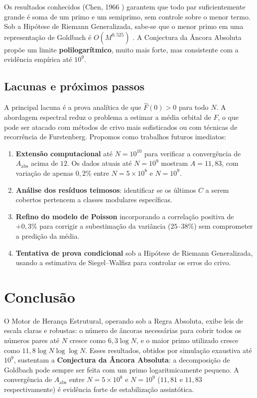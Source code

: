 \documentclass[11pt]{article}
\begin{document}
	Os resultados conhecidos (Chen, 1966 \cite{chen}) garantem que todo par suficientemente grande é soma de um primo e um semiprimo, sem controle sobre o menor termo. Sob a Hipótese de Riemann Generalizada, sabe-se que o menor primo em uma representação de Goldbach é $O(M^{0,525})$ \cite{BHP}. A Conjectura da Âncora Absoluta propõe um limite \textbf{polilogarítmico}, muito mais forte, mas consistente com a evidência empírica até $10^9$.
	
	\subsection{Lacunas e próximos passos}
	
	A principal lacuna é a prova analítica de que $\widehat{F}(0) > 0$ para todo $N$. A abordagem espectral reduz o problema a estimar a média orbital de $F$, o que pode ser atacado com métodos de crivo mais sofisticados ou com técnicas de recorrência de Furstenberg. Propomos como trabalhos futuros imediatos:
	
	\begin{enumerate}
		\item \textbf{Extensão computacional} até $N=10^{10}$ para verificar a convergência de $A_{\text{abs}}$ acima de $12$. Os dados atuais até $N=10^9$ mostram $A=11{,}83$, com variação de apenas $0{,}2\%$ entre $N=5\times10^8$ e $N=10^9$.
		\item \textbf{Análise dos resíduos teimosos}: identificar se os últimos $C$ a serem cobertos pertencem a classes modulares específicas.
		\item \textbf{Refino do modelo de Poisson} incorporando a correlação positiva de $+0{,}3\%$ para corrigir a subestimação da variância ($25$–$38\%$) sem comprometer a predição da média.
		\item \textbf{Tentativa de prova condicional} sob a Hipótese de Riemann Generalizada, usando a estimativa de Siegel–Walfisz para controlar os erros do crivo.
	\end{enumerate}
	
	\section{Conclusão}
	
	O Motor de Herança Estrutural, operando sob a Regra Absoluta, exibe leis de escala claras e robustas: o número de âncoras necessárias para cobrir todos os números pares até $N$ cresce como $6{,}3\log N$, e o maior primo utilizado cresce como $11{,}8 \log N \log\log N$. Esses resultados, obtidos por simulação exaustiva até $10^9$, sustentam a \textbf{Conjectura da Âncora Absoluta}: a decomposição de Goldbach pode sempre ser feita com um primo logaritmicamente pequeno. A convergência de $A_{\text{abs}}$ entre $N=5\times10^8$ e $N=10^9$ ($11{,}81$ e $11{,}83$ respectivamente) é evidência forte de estabilização assintótica.
	
\end{document}
